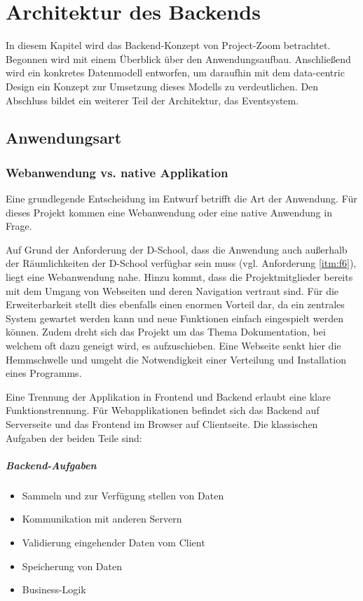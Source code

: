 \chapter{Architektur des Backends}

In diesem Kapitel wird das Backend-Konzept von Project-Zoom betrachtet. Begonnen wird mit einem Überblick über den Anwendungsaufbau. Anschließend wird ein konkretes Datenmodell entworfen, um daraufhin mit dem data-centric Design ein Konzept zur Umsetzung dieses Modells zu verdeutlichen.  Den Abschluss bildet ein weiterer Teil der Architektur, das Eventsystem.

\section{Anwendungsart}
\subsection{Webanwendung vs. native Applikation}
Eine grundlegende Entscheidung im Entwurf betrifft die Art der Anwendung. Für dieses Projekt kommen eine Webanwendung oder eine native Anwendung in Frage. 

Auf Grund der Anforderung der D-School, dass die Anwendung auch außerhalb der Räumlichkeiten der D-School verfügbar sein muss (vgl. Anforderung \ref{itm:f6}), liegt eine Webanwendung nahe. Hinzu kommt, dass die Projektmitglieder bereits mit dem Umgang von Webseiten und deren Navigation vertraut sind. Für die Erweiterbarkeit stellt dies ebenfalls einen enormen Vorteil dar, da ein zentrales System gewartet werden kann und neue Funktionen einfach eingespielt werden können. Zudem dreht sich das Projekt um das Thema Dokumentation, bei welchem oft dazu geneigt wird, es aufzuschieben. Eine Webseite senkt hier die Hemmschwelle und umgeht die Notwendigkeit einer Verteilung und Installation eines Programms.

Eine Trennung der Applikation in Frontend und Backend erlaubt eine klare Funktionstrennung. Für Webapplikationen befindet sich das Backend auf Serverseite und das Frontend im Browser auf Clientseite. Die klassischen Aufgaben der beiden Teile sind:  
\paragraph{Backend-Aufgaben}
\begin{itemize}
  \item Sammeln und zur Verfügung stellen von Daten
  \item Kommunikation mit anderen Servern
  \item Validierung eingehender Daten vom Client
  \item Speicherung von Daten
  \item Business-Logik
\end{itemize}

